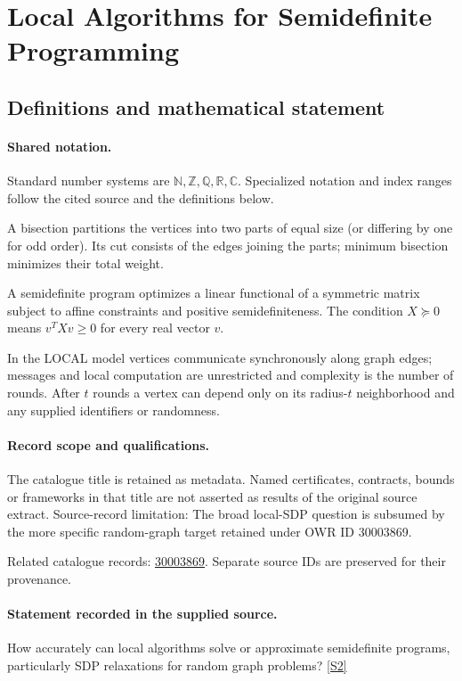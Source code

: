 \documentclass[11pt]{article}
\newcommand{\sref}[2]{\hyperlink{source:#1:#2}{[S#2]}}
\begin{document}
\section{Local Algorithms for Semidefinite Programming}\label{statement}

\subsection{Definitions and mathematical statement}

\paragraph{Shared notation.}Standard number systems are $\mathbb N,\mathbb Z,\mathbb Q,\mathbb R,\mathbb C$. Specialized notation and index ranges follow the cited source and the definitions below.


A bisection partitions the vertices into two parts of equal size (or differing by one for odd order). Its cut consists of the edges joining the parts; minimum bisection minimizes their total weight.

A semidefinite program optimizes a linear functional of a symmetric matrix subject to affine constraints and positive semidefiniteness. The condition $X\succeq0$ means $v^TXv\geq0$ for every real vector $v$.

In the LOCAL model vertices communicate synchronously along graph edges; messages and local computation are unrestricted and complexity is the number of rounds. After $t$ rounds a vertex can depend only on its radius-$t$ neighborhood and any supplied identifiers or randomness.
\paragraph{Record scope and qualifications.}
The catalogue title is retained as metadata. Named certificates, contracts, bounds or frameworks in that title are not asserted as results of the original source extract.
Source-record limitation: The broad local-SDP question is subsumed by the more specific random-graph target retained under OWR ID 30003869.

Related catalogue records: \href{https://mehmetmars7.github.io/Erdosproblems-llm-hunter/problem.html?type=open_problems&id=30003869}{30003869}. Separate source IDs are preserved for their provenance.
\paragraph{Statement recorded in the supplied source.}
How accurately can local algorithms solve or approximate semidefinite programs, particularly SDP relaxations for random graph problems? \sref{statement}{2}
\end{document}
